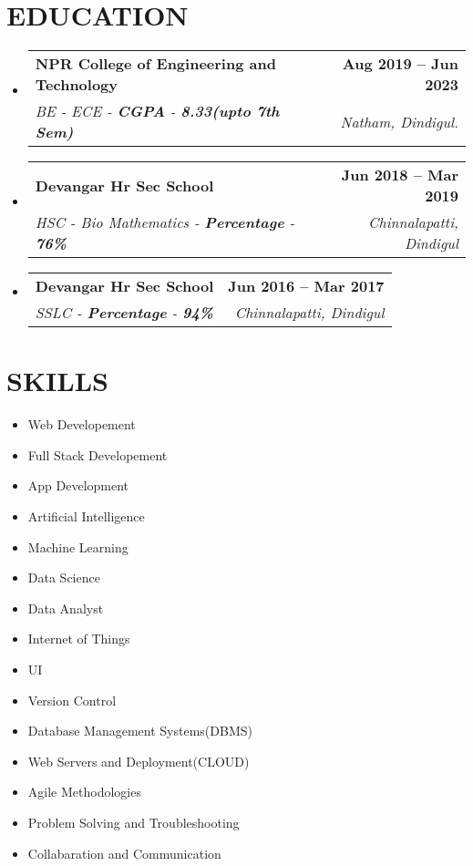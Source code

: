 \documentclass[letterpaper,11pt]{article}
\makeatletter
\newcommand{\resumeSubheading}[4]{
  \vspace{-2pt}\item
    \begin{tabular*}{1.0\textwidth}[t]{l@{\extracolsep{\fill}}r}
      \textbf{\large#1} & \textbf{\small #2} \\
      \textit{\large#3} & \textit{\small #4} \\
      
    \end{tabular*}\vspace{-7pt}
}
\newcommand{\resumeSubHeadingListStart}{\begin{itemize}[leftmargin=0.0in, label={}]}
\newcommand{\resumeSubHeadingListEnd}{\end{itemize}}
\makeatother
\begin{document}
\section{EDUCATION}
  \resumeSubHeadingListStart
    \resumeSubheading
      {NPR College of Engineering and Technology}{Aug 2019 -- Jun 2023}
      {BE - ECE  - \textbf{CGPA} - \textbf{8.33(upto 7th Sem)}}{Natham, Dindigul.}
     
  \resumeSubHeadingListEnd
  \vspace{-12pt}
  
  \resumeSubHeadingListStart
    \resumeSubheading
      {Devangar Hr Sec School}{Jun 2018 -- Mar 2019}
      {HSC -   Bio Mathematics - \textbf{Percentage} - \textbf{76\%}}{Chinnalapatti, Dindigul}
  \resumeSubHeadingListEnd
  \vspace{-10pt}

   \resumeSubHeadingListStart
    \resumeSubheading
      {Devangar Hr Sec School}{Jun 2016 -- Mar 2017}
      {SSLC - \textbf{Percentage} - \textbf{94\%}}{Chinnalapatti, Dindigul}
  \resumeSubHeadingListEnd

\section{SKILLS}
        \begin{multicols}{4}
            \begin{itemize}[itemsep=-2pt, parsep=5pt]
                \item Web Developement
                \item Full Stack Developement
                \item App Development
                \item Artificial Intelligence
                \item Machine Learning
                \item Data Science
                \item Data Analyst
                \item Internet of Things
                \item UI
                \item Version Control
                \item Database Management Systems(DBMS)
                \item Web Servers and Deployment(CLOUD)
                \item Agile Methodologies
                \item Problem Solving and Troubleshooting
                \item Collabaration and Communication 
            \end{itemize}
        \end{multicols}
        \vspace*{2.0\multicolsep}
\end{document}

